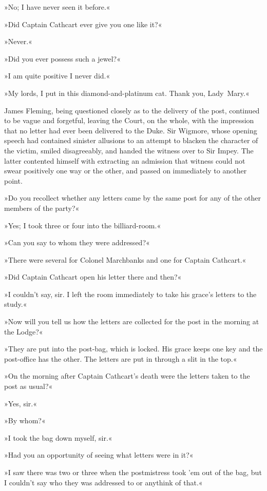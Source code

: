 »No; I have never seen it before.«

»Did Captain Cathcart ever give you one like it?«

»Never.«

»Did you ever possess such a jewel?«

»I am quite positive I never did.«

»My lords, I put in this diamond-and-platinum cat. Thank you, Lady~Mary.«

James Fleming, being questioned closely as to the delivery of the post, continued to be vague and forgetful, leaving the Court, on the whole, with the impression that no letter had ever been delivered to the Duke.  Sir Wigmore, whose opening speech had contained sinister allusions to an attempt to blacken the character of the victim, smiled disagreeably, and handed the witness over to Sir Impey. The latter contented himself with extracting an admission that witness could not swear positively one way or the other, and passed on immediately to another point.

»Do you recollect whether any letters came by the same post for any of the other members of the party?«

»Yes; I took three or four into the billiard-room.«

»Can you say to whom they were addressed?«

»There were several for Colonel Marchbanks and one for Captain Cathcart.«

»Did Captain Cathcart open his letter there and then?«

»I couldn't say, sir. I left the room immediately to take his grace's letters to the study.«

»Now will you tell us how the letters are collected for the post in the morning at the Lodge?«

»They are put into the post-bag, which is locked. His grace keeps one key and the post-office has the other. The letters are put in through a slit in the top.«

»On the morning after Captain Cathcart's death were the letters taken to the post as usual?«

»Yes, sir.«

»By whom?«

»I took the bag down myself, sir.«

»Had you an opportunity of seeing what letters were in it?«

»I saw there was two or three when the postmistress took 'em out of the bag, but I couldn't say who they was addressed to or anythink of that.«

